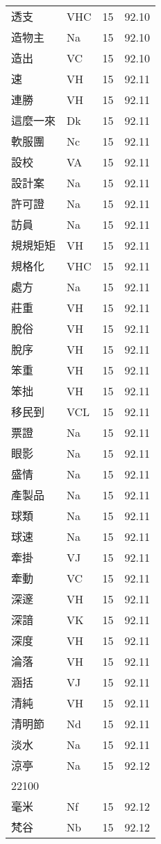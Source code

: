 \documentclass[twocolumn]{book}
\begin{document}
\begin{supertabular}{llrr}
透支 & VHC & 15 &  92.10\\
造物主 & Na & 15 &  92.10\\
造出 & VC & 15 &  92.10\\
速 & VH & 15 &  92.11\\
連勝 & VH & 15 &  92.11\\
這麼一來 & Dk & 15 &  92.11\\
軟服團 & Nc & 15 &  92.11\\
設校 & VA & 15 &  92.11\\
設計案 & Na & 15 &  92.11\\
許可證 & Na & 15 &  92.11\\
訪員 & Na & 15 &  92.11\\
規規矩矩 & VH & 15 &  92.11\\
規格化 & VHC & 15 &  92.11\\
處方 & Na & 15 &  92.11\\
莊重 & VH & 15 &  92.11\\
脫俗 & VH & 15 &  92.11\\
脫序 & VH & 15 &  92.11\\
笨重 & VH & 15 &  92.11\\
笨拙 & VH & 15 &  92.11\\
移民到 & VCL & 15 &  92.11\\
票證 & Na & 15 &  92.11\\
眼影 & Na & 15 &  92.11\\
盛情 & Na & 15 &  92.11\\
產製品 & Na & 15 &  92.11\\
球類 & Na & 15 &  92.11\\
球速 & Na & 15 &  92.11\\
牽掛 & VJ & 15 &  92.11\\
牽動 & VC & 15 &  92.11\\
深邃 & VH & 15 &  92.11\\
深諳 & VK & 15 &  92.11\\
深度 & VH & 15 &  92.11\\
淪落 & VH & 15 &  92.11\\
涵括 & VJ & 15 &  92.11\\
清純 & VH & 15 &  92.11\\
清明節 & Nd & 15 &  92.11\\
淡水 & Na & 15 &  92.11\\
涼亭 & Na & 15 &  92.12\\
22100\\
毫米 & Nf & 15 &  92.12\\
梵谷 & Nb & 15 &  92.12\\

\end{supertabular}
\end{document}
